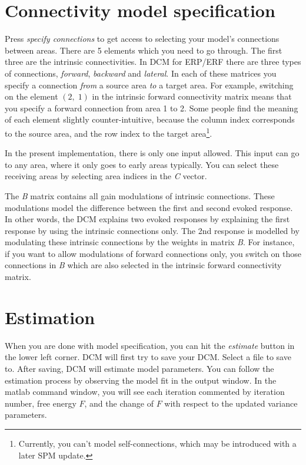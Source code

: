 \section{Connectivity model specification}
Press \textit{specify connections} to get access to selecting your model's
connections between areas. There are 5 elements
which you need to go through. The first three are the intrinsic
connectivities. In DCM for ERP/ERF there are three types of connections,
\textit{forward}, \textit{backward} and \textit{lateral}. In each of
these matrices you specify a connection \textit{from} a source area
\textit{to} a target area. For example, switching on the element
$(2,\;1)$ in the intrinsic forward connectivity matrix means that you
specify a forward connection from area 1 to 2. Some people find the
meaning of each element slightly counter-intuitive, because the
column index corresponds to the source area, and the row index to the
target area\footnote{Currently, you can't model self-connections, which may
be introduced with a later SPM update.}.

In the present implementation, there is only one input allowed. This
input can go to any area, where it only goes to early
areas typically. You can select these receiving areas by selecting area indices in
the \textit{C} vector.

The \textit{B} matrix contains all gain modulations of intrinsic
connections. These modulations model the difference between the first
and second evoked response. In other words, the DCM explains two
evoked responses by explaining the first response by using the intrinsic
connections only. The 2nd response is modelled by modulating these
intrinsic connections by the weights in matrix \textit{B}. For
instance, if you want to allow modulations of forward connections
only, you switch on those connections in \textit{B} which are also
selected in the intrinsic forward connectivity matrix.

\section{Estimation}
When you are done with model specification, you can hit the
\textit{estimate} button in the lower left corner. DCM will first try
to save your DCM. Select a file to save to. After saving, DCM will
estimate model parameters. You can follow the estimation process by
observing the model fit in the output window. In the matlab command
window, you will see each iteration commented by iteration number,
free energy $F$, and the change of $F$ with respect to the
updated variance parameters.


